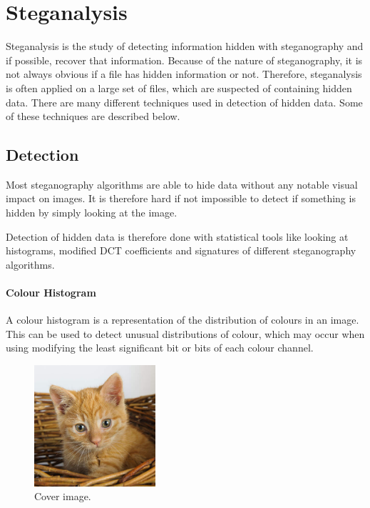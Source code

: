 \section{Steganalysis}
\label{steganalysis}
Steganalysis is the study of detecting information hidden with steganography and if possible, recover that information.
Because of the nature of steganography, it is not always obvious if a file has hidden information or not.
Therefore, steganalysis is often applied on a large set of files, which are suspected of containing hidden data.
There are many different techniques used in detection of hidden data.
Some of these techniques are described below.

\subsection{Detection}
\label{Detection}
Most steganography algorithms are able to hide data without any notable visual impact on images.
It is therefore hard if not impossible to detect if something is hidden by simply looking at the image.

Detection of hidden data is therefore done with statistical tools like looking at histograms, modified DCT coefficients and signatures of different steganography algorithms.

\paragraph*{Colour Histogram}
A colour histogram is a representation of the distribution of colours in an image. 
This can be used to detect unusual distributions of colour, which may occur when using modifying the least significant bit or bits of each colour channel.

\begin{figure}
	\centering
	\includegraphics[width=0.4\textwidth]{figures/cover.jpg}
	\caption{Cover image.}
	\label{fig:CoverImage}
\end{figure}

